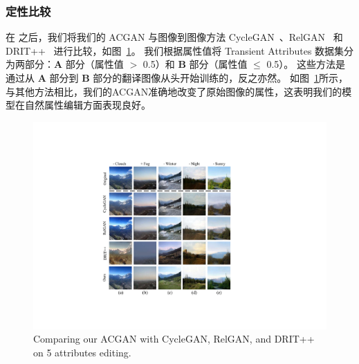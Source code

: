 \subsubsection{定性比较}
在 \cite{iclr2021} 之后，我们将我们的 ACGAN 与图像到图像方法 CycleGAN~\cite{cyclegan}、RelGAN~\cite{relgan} 和 DRIT++~\cite{drit++} 进行比较，如图~\ref{fig:sceneComparison}。 我们根据属性值将 Transient Attributes 数据集分为两部分：\textbf{A} 部分（属性值 $>$ 0.5）和 \textbf{B} 部分（属性值 $\leq$ 0.5）。 这些方法是通过从 \textbf{A} 部分到 \textbf{B} 部分的翻译图像从头开始训练的，反之亦然。
如图~\ref{fig:sceneComparison}所示，与其他方法相比，我们的ACGAN准确地改变了原始图像的属性，这表明我们的模型在自然属性编辑方面表现良好。

\begin{figure}[t]
    \begin{center}
         \includegraphics[width=0.7\linewidth]{figures/ACGAN/Scenecomparison.pdf}
    \end{center}
    \caption{Comparing our ACGAN with CycleGAN, RelGAN, and DRIT++ on 5 attributes editing.}
    \label{fig:sceneComparison}
\end{figure}

